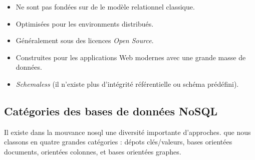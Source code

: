 \begin{itemize}
\item Ne sont pas fondées sur de le modèle relationnel classique.
\item Optimisées pour les environments distribués.
\item Généralement sous des licences \emph{Open Source}.
\item Construites pour les applications Web modernes avec une grande
  masse de données.
\item \emph{Schemaless} (il n'existe plus d'intégrité référentielle ou
  schéma prédéfini).
\end{itemize}

  \subsection{Catégories des bases de données NoSQL}
  \label{sec:cat-nosql}
  Il existe dans la mouvance \acrshort{nosql} une diversité importante
  d'approches. que nous classons en quatre grandes catégories : dépots
  clés/valeurs, bases orientées documents, orientées colonnes, et
  bases orientées graphes.

